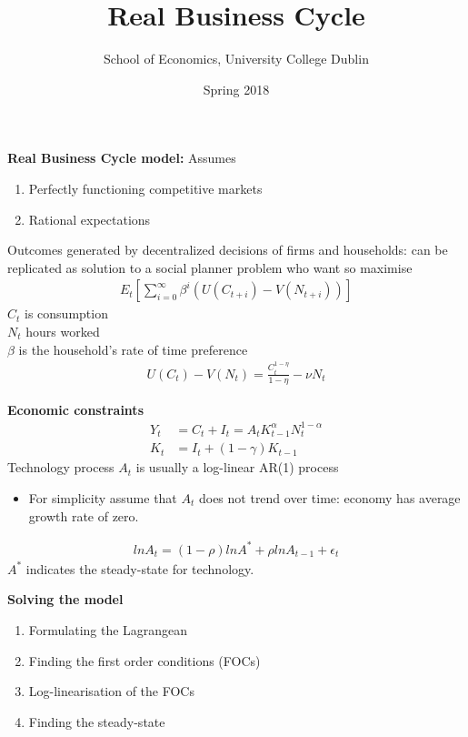 \documentclass{beamer}
\title{Real Business Cycle}
\author{School of Economics, University College Dublin}
\date{Spring 2018}
\begin{document}
\begin{frame}
 \titlepage
\end{frame}

\begin{frame}
  \textbf{Real Business Cycle model:} Assumes
  \begin{enumerate}
    \item Perfectly functioning competitive markets
    \item Rational expectations
  \end{enumerate}
  \medskip
  Outcomes generated by decentralized decisions of firms and households: can be replicated as solution to a social planner problem who want so maximise
 \begin{align}
  E_t \left[\sum^{\infty}_{i=0} \beta^i(U(C_{t+i})-V(N_{t+i})) \right]
 \end{align}
 $C_t$ is consumption\\
 $N_t$ hours worked\\
 $\beta$ is the household's rate of time preference 
\begin{align}
  U(C_t)-V(N_t)=\frac{C_t^{1-\eta}}{1-\eta}-\nu N_t
\end{align}
\end{frame}

\begin{frame}
 \textbf{Economic constraints}
\begin{align}
  Y_t &= C_t + I_t = A_tK^\alpha_{t-1}N^{1-\alpha}_t\\
  K_t &= I_t + (1-\gamma)K_{t-1}
\end{align}
  Technology process $A_t$ is usually a log-linear AR(1) process
  \begin{itemize}
    \item For simplicity assume that $A_t$ does not trend over time: economy has average growth rate of zero.
  \end{itemize}
 \begin{align}
  ln A_t= (1-\rho) ln A^* + \rho ln A_{t-1} + \epsilon_t
\end{align}
$A^*$ indicates the steady-state for technology.
\end{frame}

\begin{frame}
 \textbf{Solving the model}
 \begin{enumerate}
  \item Formulating the Lagrangean
  \item Finding the first order conditions (FOCs)
  \item Log-linearisation of the FOCs
  \item Finding the steady-state
\end{enumerate}
\end{frame}
\end{document}
